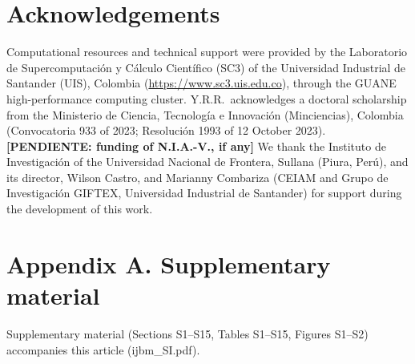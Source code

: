 \documentclass[preprint,12pt]{elsarticle}
\newcommand{\pend}[1]{\textbf{[PENDIENTE: #1]}}
\begin{document}
\section*{Acknowledgements}
Computational resources and technical support were provided by the Laboratorio de
Supercomputaci\'on y C\'alculo Cient\'ifico (SC3) of the Universidad Industrial de Santander (UIS),
Colombia (\url{https://www.sc3.uis.edu.co}), through the GUANE high-performance computing cluster.
Y.R.R.\ acknowledges a doctoral scholarship from the Ministerio de Ciencia, Tecnolog\'ia e Innovaci\'on
(Minciencias), Colombia (Convocatoria 933 of 2023; Resoluci\'on 1993 of 12 October 2023). \pend{funding of
N.I.A.-V., if any} We thank the Instituto de Investigaci\'on of the Universidad Nacional de Frontera, Sullana
(Piura, Per\'u), and its director, Wilson Castro, and Marianny Combariza (CEIAM and Grupo de
Investigaci\'on GIFTEX, Universidad Industrial de Santander) for support during the development of this
work.

\section*{Appendix A. Supplementary material}
Supplementary material (Sections S1--S15, Tables S1--S15, Figures S1--S2) accompanies this article
(ijbm\_SI.pdf).



\end{document}
